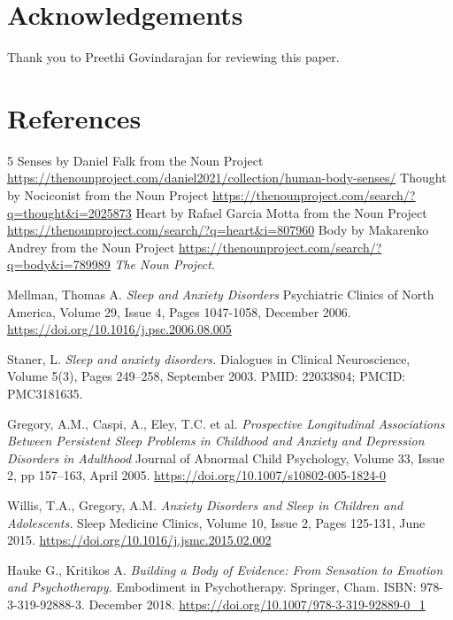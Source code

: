 \documentclass[a4paper, amsfonts, amssymb, amsmath, reprint, showkeys, nofootinbib, twoside]{revtex4-1}
\begin{document}
\section*{Acknowledgements}

Thank you to Preethi Govindarajan for reviewing this paper.


\section*{References}

\begin{thebibliography}{99}

  5 Senses by Daniel Falk from the Noun Project
  \url{https://thenounproject.com/daniel2021/collection/human-body-senses/}
  Thought by Nociconist from the Noun Project
  \url{https://thenounproject.com/search/?q=thought&i=2025873}
  Heart by Rafael Garcia Motta from the Noun Project
  \url{https://thenounproject.com/search/?q=heart&i=807960}
  Body by Makarenko Andrey from the Noun Project
  \url{https://thenounproject.com/search/?q=body&i=789989}
  \textit{The Noun Project}.

  Mellman, Thomas A.
  \textit{Sleep and Anxiety Disorders}
  Psychiatric Clinics of North America, Volume 29, Issue 4, Pages 1047-1058, December 2006.
  \url{https://doi.org/10.1016/j.psc.2006.08.005}

  Staner, L.
  \textit{Sleep and anxiety disorders.}
  Dialogues in Clinical Neuroscience, Volume 5(3), Pages 249–258, September 2003.
  PMID: 22033804; PMCID: PMC3181635.

  Gregory, A.M., Caspi, A., Eley, T.C. et al.
  \textit{Prospective Longitudinal Associations Between Persistent Sleep Problems in
    Childhood and Anxiety and Depression Disorders in Adulthood}
  Journal of Abnormal Child Psychology, Volume 33, Issue 2, pp 157–163, April 2005.
  \url{https://doi.org/10.1007/s10802-005-1824-0}

  Willis, T.A., Gregory, A.M.
  \textit{Anxiety Disorders and Sleep in Children and Adolescents.}
  Sleep Medicine Clinics, Volume 10, Issue 2, Pages 125-131, June 2015.
  \url{https://doi.org/10.1016/j.jsmc.2015.02.002}

  Hauke G., Kritikos A.
  \textit{Building a Body of Evidence: From Sensation to Emotion and Psychotherapy.}
  Embodiment in Psychotherapy. Springer, Cham.
  ISBN: 978-3-319-92888-3. December 2018.
  \url{https://doi.org/10.1007/978-3-319-92889-0_1}


\end{thebibliography}
\end{document}
